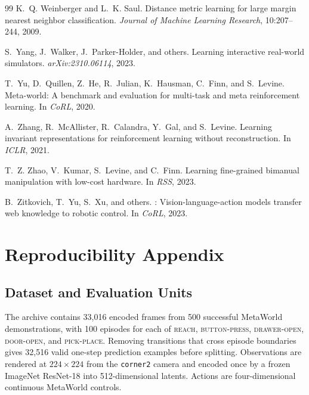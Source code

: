 \documentclass[10pt,twocolumn]{article}
\theoremstyle{tightstyle}
\begin{document}
\begin{thebibliography}{99}
K.~Q. Weinberger and L.~K. Saul.
\newblock Distance metric learning for large margin nearest neighbor classification.
\newblock \emph{Journal of Machine Learning Research}, 10:207--244, 2009.

S.~Yang, J.~Walker, J.~Parker-Holder, and others.
\newblock Learning interactive real-world simulators.
\newblock \emph{arXiv:2310.06114}, 2023.

T.~Yu, D.~Quillen, Z.~He, R.~Julian, K.~Hausman, C.~Finn, and S.~Levine.
\newblock Meta-world: A benchmark and evaluation for multi-task and meta
reinforcement learning.
\newblock In \emph{CoRL}, 2020.

A.~Zhang, R.~McAllister, R.~Calandra, Y.~Gal, and S.~Levine.
\newblock Learning invariant representations for reinforcement learning without reconstruction.
\newblock In \emph{ICLR}, 2021.

T.~Z. Zhao, V.~Kumar, S.~Levine, and C.~Finn.
\newblock Learning fine-grained bimanual manipulation with low-cost hardware.
\newblock In \emph{RSS}, 2023.

B.~Zitkovich, T.~Yu, S.~Xu, and others.
: Vision-language-action models transfer web knowledge to robotic control.
\newblock In \emph{CoRL}, 2023.

\end{thebibliography}

\clearpage
\appendix
\section{Reproducibility Appendix}
\label{app:reproducibility}

\subsection{Dataset and Evaluation Units}

The archive contains 33,016 encoded frames from 500 successful MetaWorld
demonstrations, with 100 episodes for each of \textsc{reach},
\textsc{button-press}, \textsc{drawer-open}, \textsc{door-open}, and
\textsc{pick-place}. Removing transitions that cross episode boundaries gives
32,516 valid one-step prediction examples before splitting. Observations are
rendered at $224\times224$ from the \texttt{corner2} camera and encoded once by a
frozen ImageNet ResNet-18 into 512-dimensional latents. Actions are
four-dimensional continuous MetaWorld controls.
\end{document}
